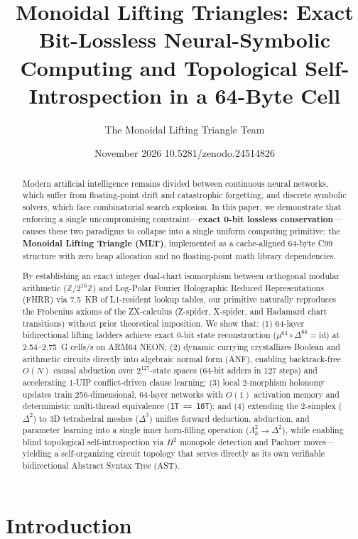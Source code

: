 \documentclass[11pt, a4paper]{article}
\title{\textbf{Monoidal Lifting Triangles: Exact Bit-Lossless Neural-Symbolic Computing and Topological Self-Introspection in a 64-Byte Cell}}
\author{The Monoidal Lifting Triangle Team}
\date{November 2026 10.5281/zenodo.24514826}
\begin{document}
\maketitle

\begin{abstract}
Modern artificial intelligence remains divided between continuous neural networks, which suffer from floating-point drift and catastrophic forgetting, and discrete symbolic solvers, which face combinatorial search explosion. In this paper, we demonstrate that enforcing a single uncompromising constraint---\textbf{exact 0-bit lossless conservation}---causes these two paradigms to collapse into a single uniform computing primitive: the \textbf{Monoidal Lifting Triangle (MLT)}, implemented as a cache-aligned 64-byte C99 structure with zero heap allocation and no floating-point math library dependencies.

By establishing an exact integer dual-chart isomorphism between orthogonal modular arithmetic ($\mathbb{Z}/2^{16}\mathbb{Z}$) and Log-Polar Fourier Holographic Reduced Representations (FHRR) via 7.5~KB of L1-resident lookup tables, our primitive naturally reproduces the Frobenius axioms of the ZX-calculus (Z-spider, X-spider, and Hadamard chart transitions) without prior theoretical imposition. We show that: (1) 64-layer bidirectional lifting ladders achieve exact 0-bit state reconstruction ($\mu^{64} \circ \Delta^{64} = \mathrm{id}$) at 2.54--2.75~G cells/s on ARM64 NEON; (2) dynamic currying crystallizes Boolean and arithmetic circuits directly into algebraic normal form (ANF), enabling backtrack-free $O(N)$ causal abduction over $2^{127}$-state spaces (64-bit adders in 127 steps) and accelerating 1-UIP conflict-driven clause learning; (3) local 2-morphism holonomy updates train 256-dimensional, 64-layer networks with $O(1)$ activation memory and deterministic multi-thread equivalence (\texttt{1T == 10T}); and (4) extending the 2-simplex ($\Delta^2$) to 3D tetrahedral meshes ($\Delta^3$) unifies forward deduction, abduction, and parameter learning into a single inner horn-filling operation ($\Lambda^2_k \to \Delta^2$), while enabling blind topological self-introspection via $H^2$ monopole detection and Pachner moves---yielding a self-organizing circuit topology that serves directly as its own verifiable bidirectional Abstract Syntax Tree (AST).
\end{abstract}

\section{Introduction}
\end{document}

